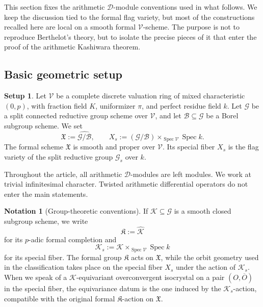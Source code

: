 \documentclass[11pt]{amsart}
\theoremstyle{plain}
\theoremstyle{definition}
\newtheorem{notation}{Notation}[section]
\newtheorem{setup}{Setup}[section]
\theoremstyle{remark}
\newcommand{\Spec}{\operatorname{Spec}}
\begin{document}
This section fixes the arithmetic \(\mathscr D\)-module conventions used in
what follows.  We keep the discussion tied to the formal flag variety, but most
of the constructions recalled here are local on a smooth formal
\(\mathcal V\)-scheme.  The purpose is not to reproduce Berthelot's theory, but
to isolate the precise pieces of it that enter the proof of the arithmetic
Kashiwara theorem.

\subsection{Basic geometric setup}

\begin{setup}
\label{setup:basic}
Let \(\mathcal V\) be a complete discrete valuation ring of mixed
characteristic \((0,p)\), with fraction field \(K\), uniformizer \(\pi\), and
perfect residue field \(k\). Let \(\mathcal G\) be a split connected reductive
group scheme over \(\mathcal V\), and let \(\mathcal B\subseteq\mathcal G\) be a
Borel subgroup scheme. We set
\[
  \mathfrak X:=\widehat{\mathcal G/\mathcal B},
  \qquad
  X_s:=(\mathcal G/\mathcal B)\times_{\Spec\mathcal V}\Spec k.
\]
The formal scheme \(\mathfrak X\) is smooth and proper over \(\mathcal V\). Its
special fiber \(X_s\) is the flag variety of the split reductive group
\(\mathcal G_s\) over \(k\).
\end{setup}

Throughout the article, all arithmetic \(\mathscr D\)-modules are left modules.
We work at trivial infinitesimal character. Twisted arithmetic differential
operators do not enter the main statements.

\begin{notation}[Group-theoretic conventions]
\label{not:group-conventions}
If \(\mathcal K\subseteq\mathcal G\) is a smooth closed subgroup scheme, we
write
\[
  \mathfrak K:=\widehat{\mathcal K}
\]
for its \(p\)-adic formal completion and
\[
  \mathcal K_s:=\mathcal K\times_{\Spec\mathcal V}\Spec k
\]
for its special fiber.  The formal group \(\mathfrak K\) acts on
\(\mathfrak X\), while the orbit geometry used in the classification takes
place on the special fiber \(X_s\) under the action of \(\mathcal K_s\).
When we speak of a \(\mathcal K\)-equivariant overconvergent isocrystal on a
pair \((O,\overline O)\) in the special fiber, the equivariance datum is the
one induced by the \(\mathcal K_s\)-action, compatible with the original formal
\(\mathfrak K\)-action on \(\mathfrak X\).
\end{notation}
\end{document}
